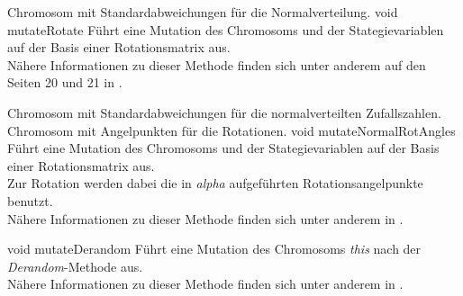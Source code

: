 \documentclass{report}
\begin{document}
\setNormalInstance
\setCorrectWidthThree{8pt}
{Chromosom mit Standardabweichungen f\"ur die Normalverteilung.}
\printMethodWithParamsSaved 
{void}
{}
{mutateRotate}
{F\"uhrt eine Mutation des Chromosoms und der Stategievariablen auf der
 Basis einer Rotationsmatrix aus.\\
 N\"ahere Informationen zu dieser Methode finden sich unter anderem
 auf den Seiten 20 und 21 in \cite{EALib}.}
{}
\setCorrectWidthThree{4pt}

\vspace{4ex}

\setNormalInstance
\setCorrectWidthThree{8pt}
{Chromosom mit Standardabweichungen f\"ur die normalverteilten Zufallszahlen.}
{Chromosom mit Angelpunkten f\"ur die Rotationen.}
\printMethodWithParamsSaved
{void}
{}
{mutateNormalRotAngles}
{F\"uhrt eine Mutation des Chromosoms und der Stategievariablen auf der
 Basis einer Rotationsmatrix aus.\\
 Zur Rotation werden dabei die in {\em alpha} aufgef\"uhrten
 Rotationsangelpunkte benutzt.\\
 N\"ahere Informationen zu dieser Methode finden sich unter anderem
 in \cite{GSA}.}
{}
\setCorrectWidthThree{4pt}

\newpage

\setNormalInstance
\setCorrectWidthThree{8pt}
\printMethodWithParamsSaved
{void}
{}
{mutateDerandom}
{F\"uhrt eine Mutation des Chromosoms {\em this} nach der 
 {\em Derandom}-Methode aus.\\
 N\"ahere Informationen zu dieser Methode finden sich unter anderem
 in \cite{GSA}.}
{}
\setCorrectWidthThree{4pt}
\end{document}
